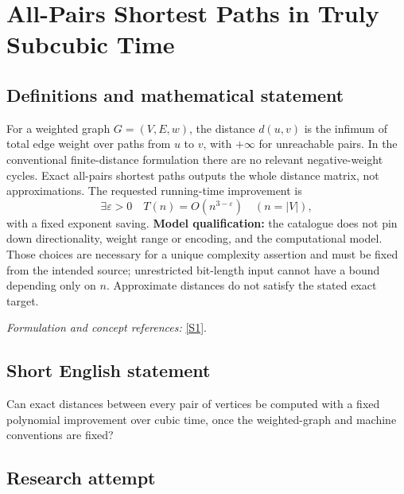 \documentclass[11pt,a4paper]{article}
\newcommand{\eps}{\varepsilon}
\newcommand{\sref}[2]{\hyperlink{source:#1:#2}{[S#2]}}
\newif\ifshowcatalogue
\newcommand{\cataloguescope}[1]{\ifshowcatalogue
 \paragraph{Exact scope in the supplied catalogue.}
 \begin{quote}\small #1\end{quote}\fi}
\numberwithin{equation}{section}
\begin{document}
\setcounter{section}{0}
\clearpage
\section*{\texorpdfstring{All-Pairs Shortest Paths in Truly Subcubic Time}{All-Pairs Shortest Paths in Truly Subcubic Time}}\label{30006803}
\subsection{Definitions and mathematical statement}
For a weighted graph $G=(V,E,w)$, the distance $d(u,v)$ is the infimum of total edge weight over paths from $u$ to $v$, with $+\infty$ for unreachable pairs. In the conventional finite-distance formulation there are no relevant negative-weight cycles. Exact all-pairs shortest paths outputs the whole distance matrix, not approximations. The requested running-time improvement is
\[
 \exists\eps>0\quad T(n)=O(n^{3-\eps})\quad(n=|V|),
\]
with a fixed exponent saving. \textbf{Model qualification:} the catalogue does not pin down directionality, weight range or encoding, and the computational model. Those choices are necessary for a unique complexity assertion and must be fixed from the intended source; unrestricted bit-length input cannot have a bound depending only on $n$. Approximate distances do not satisfy the stated exact target.
\par\smallskip\textit{Formulation and concept references:} \sref{30006803}{1}.
\cataloguescope{Determine whether exact all-pairs shortest paths on weighted n-vertex graphs can be computed in O(n\textasciicircum{}(3-epsilon)) time for some fixed epsilon greater than zero.}
\subsection{Short English statement}
Can exact distances between every pair of vertices be computed with a fixed polynomial improvement over cubic time, once the weighted-graph and machine conventions are fixed?
\subsection{Research attempt}
\end{document}
